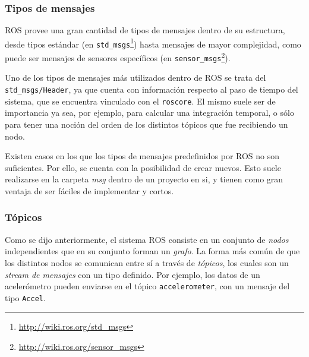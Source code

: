 \subsubsection{Tipos de mensajes}
ROS provee una gran cantidad de tipos de mensajes dentro de su estructura, desde tipos estándar (en \texttt{std\_msgs}\footnote{\url{http://wiki.ros.org/std_msgs}}) hasta mensajes de mayor complejidad, como puede ser mensajes de sensores específicos (en \texttt{sensor\_msgs}\footnote{\url{http://wiki.ros.org/sensor_msgs}}).

Uno de los tipos de mensajes más utilizados dentro de ROS se trata del \texttt{std\_msgs/Header}, ya que cuenta con información respecto al paso de tiempo del sistema, que se encuentra vinculado con el \texttt{roscore}. El mismo suele ser de importancia ya sea, por ejemplo, para calcular una integración temporal, o sólo para tener una noción del orden de los distintos tópicos que fue recibiendo un nodo.

Existen casos en los que los tipos de mensajes predefinidos por ROS no son suficientes. Por ello, se cuenta con la posibilidad de crear nuevos. Esto suele realizarse en la carpeta \textit{msg} dentro de un proyecto en si, y tienen como gran ventaja de ser fáciles de implementar y cortos.

\subsubsection{Tópicos}
Como se dijo anteriormente, el sistema ROS consiste en un conjunto de \textit{nodos} independientes que en su conjunto forman un \textit{grafo}. La forma más común de que los distintos nodos se comunican entre sí a través de \textit{tópicos}, los cuales son un \textit{stream de mensajes} con un tipo definido. Por ejemplo, los datos de un acelerómetro pueden enviarse en el tópico \texttt{accelerometer}, con un mensaje del tipo \texttt{Accel}. 

